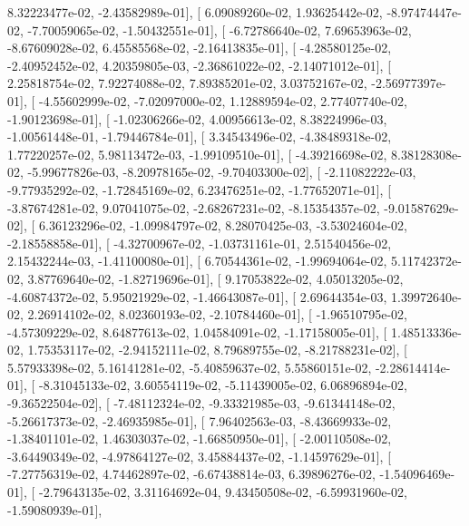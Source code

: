 \documentclass{article}
\begin{document}
          8.32223477e-02,  -2.43582989e-01],
       [  6.09089260e-02,   1.93625442e-02,  -8.97474447e-02,
         -7.70059065e-02,  -1.50432551e-01],
       [ -6.72786640e-02,   7.69653963e-02,  -8.67609028e-02,
          6.45585568e-02,  -2.16413835e-01],
       [ -4.28580125e-02,  -2.40952452e-02,   4.20359805e-03,
         -2.36861022e-02,  -2.14071012e-01],
       [  2.25818754e-02,   7.92274088e-02,   7.89385201e-02,
          3.03752167e-02,  -2.56977397e-01],
       [ -4.55602999e-02,  -7.02097000e-02,   1.12889594e-02,
          2.77407740e-02,  -1.90123698e-01],
       [ -1.02306266e-02,   4.00956613e-02,   8.38224996e-03,
         -1.00561448e-01,  -1.79446784e-01],
       [  3.34543496e-02,  -4.38489318e-02,   1.77220257e-02,
          5.98113472e-03,  -1.99109510e-01],
       [ -4.39216698e-02,   8.38128308e-02,  -5.99677826e-03,
         -8.20978165e-02,  -9.70403300e-02],
       [ -2.11082222e-03,  -9.77935292e-02,  -1.72845169e-02,
          6.23476251e-02,  -1.77652071e-01],
       [ -3.87674281e-02,   9.07041075e-02,  -2.68267231e-02,
         -8.15354357e-02,  -9.01587629e-02],
       [  6.36123296e-02,  -1.09984797e-02,   8.28070425e-03,
         -3.53024604e-02,  -2.18558858e-01],
       [ -4.32700967e-02,  -1.03731161e-01,   2.51540456e-02,
          2.15432244e-03,  -1.41100080e-01],
       [  6.70544361e-02,  -1.99694064e-02,   5.11742372e-02,
          3.87769640e-02,  -1.82719696e-01],
       [  9.17053822e-02,   4.05013205e-02,  -4.60874372e-02,
          5.95021929e-02,  -1.46643087e-01],
       [  2.69644354e-03,   1.39972640e-02,   2.26914102e-02,
          8.02360193e-02,  -2.10784460e-01],
       [ -1.96510795e-02,  -4.57309229e-02,   8.64877613e-02,
          1.04584091e-02,  -1.17158005e-01],
       [  1.48513336e-02,   1.75353117e-02,  -2.94152111e-02,
          8.79689755e-02,  -8.21788231e-02],
       [  5.57933398e-02,   5.16141281e-02,  -5.40859637e-02,
          5.55860151e-02,  -2.28614414e-01],
       [ -8.31045133e-02,   3.60554119e-02,  -5.11439005e-02,
          6.06896894e-02,  -9.36522504e-02],
       [ -7.48112324e-02,  -9.33321985e-03,  -9.61344148e-02,
         -5.26617373e-02,  -2.46935985e-01],
       [  7.96402563e-03,  -8.43669933e-02,  -1.38401101e-02,
          1.46303037e-02,  -1.66850950e-01],
       [ -2.00110508e-02,  -3.64490349e-02,  -4.97864127e-02,
          3.45884437e-02,  -1.14597629e-01],
       [ -7.27756319e-02,   4.74462897e-02,  -6.67438814e-03,
          6.39896276e-02,  -1.54096469e-01],
       [ -2.79643135e-02,   3.31164692e-04,   9.43450508e-02,
         -6.59931960e-02,  -1.59080939e-01],
\end{document}
